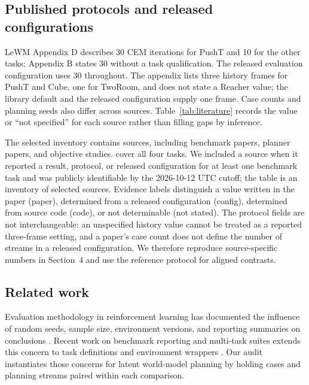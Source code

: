 \documentclass[manuscript,screen,review]{jair}
\begin{document}
\subsection{Published protocols and released configurations}
LeWM Appendix D describes 30 CEM iterations for PushT and 10 for the other tasks; Appendix B states 30 without a task qualification. The released evaluation configuration uses 30 throughout. The appendix lists three history frames for PushT and Cube, one for TwoRoom, and does not state a Reacher value; the library default and the released configuration supply one frame. Case counts and planning seeds also differ across sources. Table~\ref{tab:literature} records the value or “not specified” for each source rather than filling gaps by inference.


The selected inventory contains \PublicSourceCount{} sources, including benchmark papers, planner papers, and objective studies. \FourTaskSourceCount{} cover all four tasks. We included a source when it reported a result, protocol, or released configuration for at least one benchmark task and was publicly identifiable by the 2026-10-12 UTC cutoff; the table is an inventory of selected sources. Evidence labels distinguish a value written in the paper (paper), determined from a released configuration (config), determined from source code (code), or not determinable (not stated). The protocol fields are not interchangeable: an unspecified history value cannot be treated as a reported three-frame setting, and a paper's case count does not define the number of streams in a released configuration. We therefore reproduce source-specific numbers in Section~4 and use the reference protocol for aligned contrasts.

\subsection{Related work}
Evaluation methodology in reinforcement learning has documented the influence of random seeds, sample size, environment versions, and reporting summaries on conclusions \parencite{henderson2018,machado2018,agarwal2021,gundersen2024}. Recent work on benchmark reporting and multi-task suites extends this concern to task definitions and environment wrappers \parencite{patterson2024,metaworldplus2025}. Our audit instantiates those concerns for latent world-model planning by holding cases and planning streams paired within each comparison.
\end{document}
